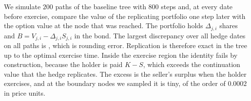 We simulate $200$ paths of the baseline tree with $800$ steps and, at every date before exercise, compare the value of the replicating portfolio one step later with the option value at the node that was reached.
The portfolio holds $\Delta_{j,i}$ shares and $B=V_{j,i}-\Delta_{j,i}S_{j,i}$ in the bond.
The largest discrepancy over all hedge dates on all paths is \ReplError, which is rounding error.
Replication is therefore exact in the tree up to the optimal exercise time.
Inside the exercise region the identity fails by construction, because the holder is paid $K-S$, which exceeds the continuation value that the hedge replicates.
The excess is the seller's surplus when the holder exercises, and at the boundary nodes we sampled it is tiny, of the order of $0.0002$ in price units.
